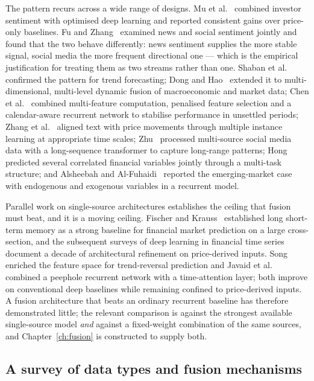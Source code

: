 The pattern recurs across a wide range of designs. Mu et al.~\cite{mu2023investor} combined
investor sentiment with optimised deep learning and reported consistent gains over price-only
baselines. Fu and Zhang~\cite{fu2024} examined news and social sentiment jointly and found that
the two behave differently: news sentiment supplies the more stable signal, social media the
more frequent directional one --- which is the empirical justification for treating them as two
streams rather than one. Shaban et al.~\cite{shaban2024} confirmed the pattern for trend
forecasting; Dong and Hao~\cite{dong2024} extended it to multi-dimensional, multi-level dynamic
fusion of macroeconomic and market data; Chen et al.~\cite{chen2024lasso} combined multi-feature
computation, penalised feature selection and a calendar-aware recurrent network to stabilise
performance in unsettled periods; Zhang et al.~\cite{zhang2018mil} aligned text with price
movements through multiple instance learning at appropriate time scales; Zhu~\cite{zhu2025informer}
processed multi-source social media data with a long-sequence transformer to capture long-range
patterns; Hong~\cite{hong2025mtl} predicted several correlated financial variables jointly
through a multi-task structure; and Alsheebah and Al-Fuhaidi~\cite{alsheebah2024} reported the
emerging-market case with endogenous and exogenous variables in a recurrent model.

Parallel work on single-source architectures establishes the ceiling that fusion must beat, and
it is a moving ceiling. Fischer and Krauss~\cite{fischer2018} established long short-term memory
as a strong baseline for financial market prediction on a large cross-section, and the
subsequent surveys of deep learning in financial time
series~\cite{sezer2020,ozbayoglu2020,jiang2021} document a decade of architectural refinement on
price-derived inputs. Song~\cite{song2024} enriched the feature space for trend-reversal
prediction and Javaid et al.~\cite{javaid2024} combined a peephole recurrent network with a
time-attention layer; both improve on conventional deep baselines while remaining confined to
price-derived inputs. A fusion architecture that beats an ordinary recurrent baseline has
therefore demonstrated little; the relevant comparison is against the strongest available
single-source model \emph{and} against a fixed-weight combination of the same sources, and
Chapter~\ref{ch:fusion} is constructed to supply both.

\subsection{A survey of data types and fusion mechanisms}

